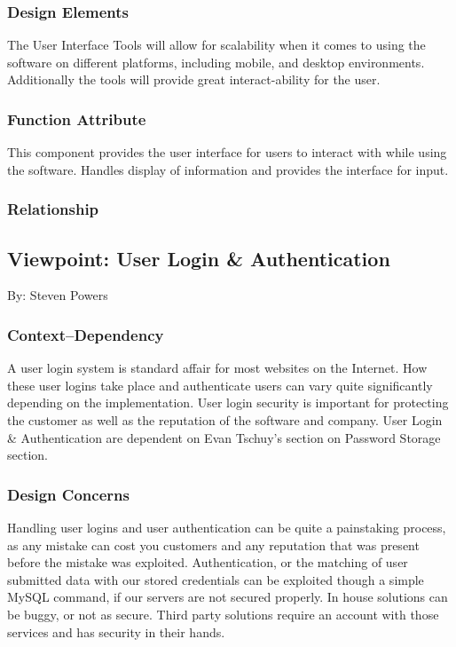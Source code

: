 \documentclass[letterpaper, 10pt, draftclsnofoot, compsoc, onecolumn]{IEEEtran}
\begin{document}
\subsubsection{Design Elements}
{\noindent The User Interface Tools will allow for scalability when it comes to
using the software on different platforms, including mobile, and desktop environments.
Additionally the tools will provide great interact-ability for the user.\par}

\subsubsection{Function Attribute}
{\noindent This component provides the user interface for users to interact with while using the software.
Handles display of information and provides the interface for input.  \par}

\subsubsection{Relationship}


\subsection{Viewpoint: User Login \& Authentication}
{\noindent By: Steven Powers  \par}

\subsubsection{Context--Dependency}
{\noindent A user login system is standard affair for most websites on the Internet.
How these user logins take place and authenticate users can vary quite
significantly depending on the implementation.
User login security is important for protecting the customer as well as
the reputation of the software and company. User Login \& Authentication
are dependent on Evan Tschuy's section on Password Storage section. \par}

\subsubsection{Design Concerns}
{\noindent Handling user logins and user authentication can be quite a painstaking process,
as any mistake can cost you customers and any reputation that was present
before the mistake was exploited. Authentication, or the matching of user submitted
data with our stored credentials can be exploited though a simple MySQL command,
if our servers are not secured properly. In house solutions can be buggy, or not as secure.
Third party solutions require an account with those services and has security in their hands. \par}
\end{document}
